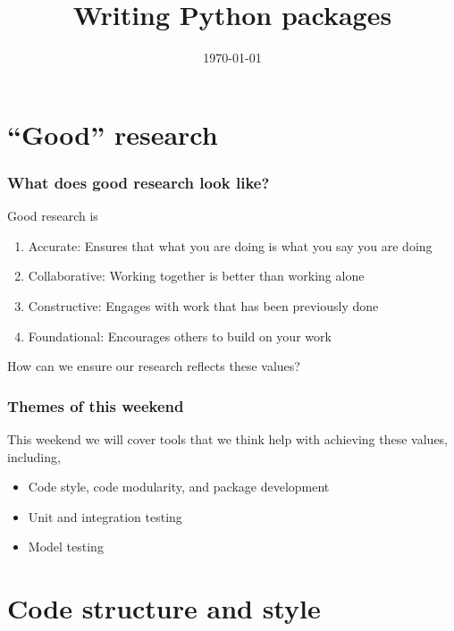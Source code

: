 \documentclass[10pt]{beamer}
\title{Writing Python packages}
\date[]{\today}
\begin{document}
\begin{frame}
  \titlepage
\end{frame}

\section{``Good'' research}

  \begin{frame} \frametitle{What does good research look like?}

    Good research is

    \begin{enumerate}
      \item Accurate: Ensures that what you are doing is what you say you are doing
      \item Collaborative: Working together is better than working alone
      \item Constructive: Engages with work that has been previously done
      \item Foundational: Encourages others to build on your work
    \end{enumerate}

    How can we ensure our research reflects these values?

  \end{frame}

  \begin{frame} \frametitle{Themes of this weekend}

    This weekend we will cover tools that we think help with achieving these values, including,

    \begin{itemize}
      \item Code style, code modularity, and package development
      \item Unit and integration testing
      \item Model testing
    \end{itemize}

  \end{frame}


\section{Code structure and style}
\end{document}
